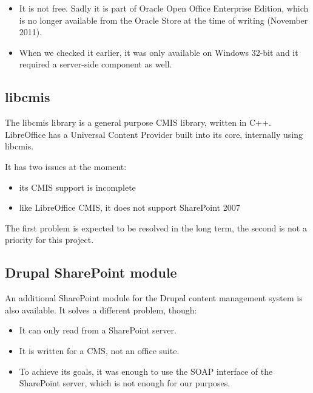 \begin{itemize}
\item It is not free. Sadly it is part of Oracle Open Office Enterprise
Edition, which is no longer available from the Oracle Store at the time of
writing (November 2011).
\item When we checked it earlier, it was only available on Windows 32-bit and it
required a server-side component as well.
\end{itemize}

\subsection*{libcmis}
The libcmis \cite{libcmis} library is a general purpose CMIS library, written
in C++.  LibreOffice has a Universal Content Provider built into its core,
internally using libcmis.

It has two issues at the moment:

\begin{itemize}
\item its CMIS support is incomplete
\item like LibreOffice CMIS, it does not support SharePoint 2007
\end{itemize}

The first problem is expected to be resolved in the long term, the second is
not a priority for this project.

\subsection*{Drupal SharePoint module}

An additional SharePoint module \cite{drupal-sp} for the Drupal content management system is also available. It solves a different problem, though:

\begin{itemize}
\item It can only read from a SharePoint server.
\item It is written for a CMS, not an office suite.
\item To achieve its goals, it was enough to use the SOAP interface of the
SharePoint server, which is not enough for our purposes.
\end{itemize}

